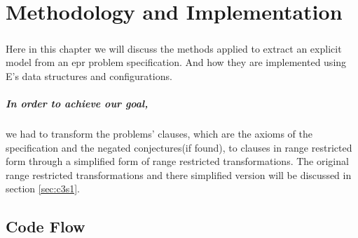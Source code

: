 \chapter{Methodology and Implementation}\label{chap:meth_and_impl}

	\paragraph{ } Here in this chapter we will discuss the methods applied to extract an explicit model from an \ac{epr} problem specification. And how they are implemented using E's data structures and configurations.

	\paragraph{    In order to achieve our goal,} we had to transform the problems' clauses, which are the axioms of the specification and the negated conjectures(if found), to clauses in range restricted form through a simplified form of range restricted transformations. The original range restricted transformations and there simplified version will be discussed in section \ref{sec:c3s1}.  

	

	\section{Code Flow}
